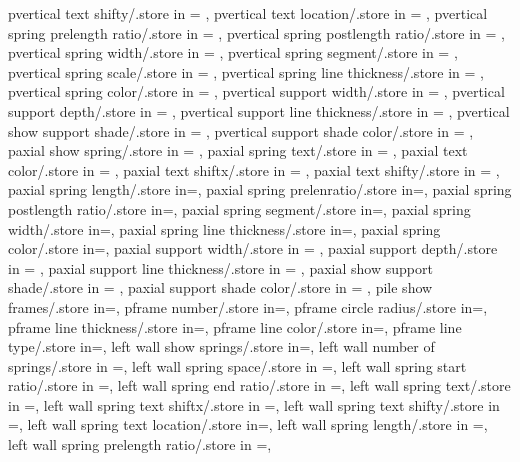 {pvertical text shifty/.store in = \pvertextshifty,
pvertical text location/.store in = \pvertextloc,
pvertical spring prelength ratio/.store in = \pverprelenratio,
pvertical spring postlength ratio/.store in = \pverpostlenratio,
pvertical spring width/.store in = \pverampl,
pvertical spring segment/.store in = \pversegm,
pvertical spring scale/.store in = \pverspringscale,
pvertical spring line thickness/.store in = \pverspringthk,
pvertical spring color/.store in = \pverspringcolor,
pvertical support width/.store in = \pversuppwidth,
pvertical support depth/.store in = \pversuppdepth,
pvertical support line thickness/.store in = \pversupplinethk,
pvertical show support shade/.store in = \pvershowsuppshade,
pvertical support shade color/.store in = \pversuppshadecol,
paxial show spring/.store in = \showpaxialspring,
paxial spring text/.store in = \paxialspringtext,
paxial text color/.store in = \paxialtextcolor,
paxial text shiftx/.store in = \paxialtextshiftx,
paxial text shifty/.store in = \paxialtextshifty,
paxial spring length/.store in=\paxialspringlength,
paxial spring prelenratio/.store in=\paxialspringprelenratio,
paxial spring postlength ratio/.store in=\paxialspringpostlenratio,
paxial spring segment/.store in=\paxialspringsegm,
paxial spring width/.store in=\paxialspringwidth,
paxial spring line thickness/.store in=\paxialspringlinethk,
paxial spring color/.store in=\paxialspringcolor,
paxial support width/.store in = \paxialsuppwidth,
paxial support depth/.store in = \paxialsuppdepth,
paxial support line thickness/.store in = \paxialsupplinethk,
paxial show support shade/.store in = \paxialshowsuppshade,
paxial support shade color/.store in = \paxialsuppshadecol,
pile show frames/.store in=\showpframes,
pframe number/.store in=\pframenumber,
pframe circle radius/.store in=\pframecirclerad,
pframe line thickness/.store in=\pframelinethk,
pframe line color/.store in=\pframelinecolor,
pframe line type/.store in=\pframelinetype,
left wall show springs/.store in=\leftwshowsprings,
left wall number of springs/.store in =\leftwspringnumber,
left wall spring space/.store in =\leftwspringspace,
left wall spring start ratio/.store in =\leftwspringstartratio,
left wall spring end ratio/.store in =\leftwspringendratio,
left wall spring text/.store in =\leftwspringtext,
left wall spring text shiftx/.store in =\leftwtextshiftx,
left wall spring text shifty/.store in =\leftwtextshifty,
left wall spring text location/.store in=\leftwspringtextloc,
left wall spring length/.store in =\leftwspringlength,
left wall spring prelength ratio/.store in =\leftwprelenratio,
}
